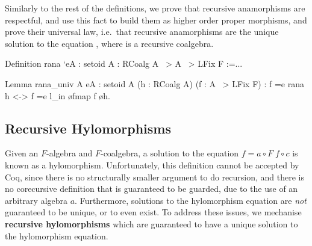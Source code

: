 \documentclass[anonymous, a4paper, UKenglish, cleveref, autoref, thm-restate]{lipics-v2021}
\begin{document}
Similarly to the rest of the definitions, we prove that recursive anamorphisms
are respectful, and use this fact to build them as higher order proper
morphisms, and prove their universal law, i.e.\ that recursive anamorphisms are
the unique solution to the equation 
,
where  is a recursive coalgebra.
\begin{coqcode}
Definition rana `{eA : setoid A} : RCoalg A ~> A ~> LFix F :=...

Lemma rana_univ A {eA : setoid A} (h : RCoalg A) (f : A ~> LFix F)
    : f =e rana h <-> f =e l_in \o fmap f \o h.
\end{coqcode}

\subsection{Recursive Hylomorphisms}

Given an $F$-algebra and $F$-coalgebra, a solution to the equation $f = a \circ
F\; f \circ c$ is known as a hylomorphism. Unfortunately, this definition
cannot be accepted by Coq, since there is no structurally smaller argument to
do recursion, and there is no corecursive definition that is guaranteed to be
guarded, due to the use of an arbitrary algebra $a$. Furthermore, solutions to
the hylomorphism equation are \emph{not} guaranteed to be unique, or to even
exist. To address these issues, we mechanise \textbf{recursive hylomorphisms}
which are guaranteed to have a unique solution to the hylomorphism equation.
\end{document}
